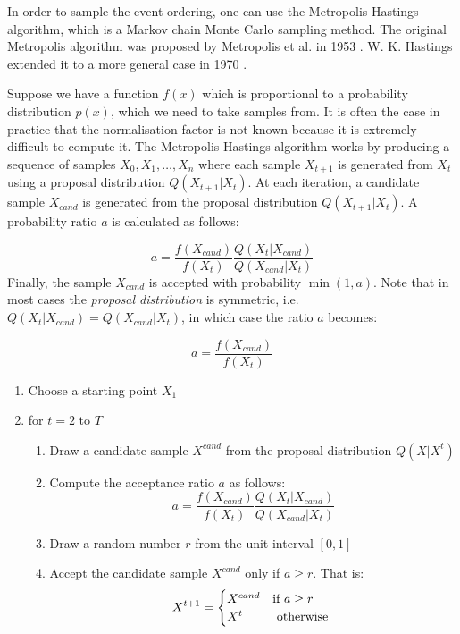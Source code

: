
In order to sample the event ordering, one can use the Metropolis Hastings algorithm, which is a Markov chain Monte Carlo sampling  method. The original Metropolis algorithm was proposed by Metropolis et al. in 1953 \cite{metropolis1953equation}. W. K. Hastings extended it to a more general case in 1970 \cite{hastings1970monte}. 

Suppose we have a function $f(x)$ which is proportional to a probability distribution $p(x)$, which we need to take samples from. It is often the case in practice that the normalisation factor is not known because it is extremely difficult to compute it. The Metropolis Hastings algorithm works by producing a sequence of samples $X_0,X_1,\dots,X_n$ where each sample $X_{t+1}$ is generated from $X_t$ using a proposal distribution $Q(X_{t+1}|X_t)$. At each iteration, a candidate sample $X_{cand}$ is generated from the proposal distribution $Q(X_{t+1}|X_t)$. A probability ratio $a$ is calculated as follows:

\begin{equation}
 a = \frac{f(X_{cand})}{f(X_{t})} \frac{Q(X_t|X_{cand})}{Q(X_{cand}|X_t)}
\end{equation}
Finally, the sample $X_{cand}$ is accepted with probability $\min(1, a)$. Note that in most cases the \emph{proposal distribution} is symmetric, i.e. $Q(X_t|X_{cand}) = Q(X_{cand}|X_t)$, in which case the ratio $a$ becomes:

$$a = \frac{f(X_{cand})}{f(X_{t})}$$

\begin{myalgo}
 \begin{enumerate}[label*=\arabic*.]
  \item Choose a starting point $X_1$
  \item for $t=2$ to $T$
  \begin{enumerate}[label*=\arabic*.]
    \item Draw a candidate sample $X^{cand}$ from the proposal distribution $Q(X|X^t)$
    \item Compute the acceptance ratio $a$ as follows:
       $$a = \frac{f(X_{cand})}{f(X_{t})} \frac{Q(X_t|X_{cand})}{Q(X_{cand}|X_t)}$$
    \item Draw a random number $r$ from the unit interval $[0,1]$
    \item Accept the candidate sample $X^{cand}$ only if $a \ge r$. That is:
       $$ X^{t+1} = \begin{cases} \hfill X^{cand} &\mbox{if } a \ge r \\ 
					      X^t & \mbox{ otherwise }\end{cases}$$
    
  \end{enumerate}
  
 \end{enumerate}

\end{myalgo}


